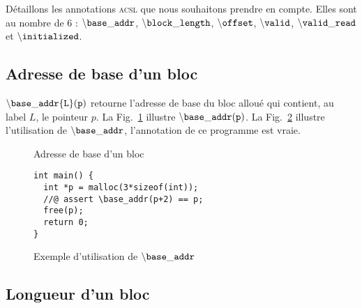 Détaillons les annotations \textsc{acsl} que nous souhaitons prendre en compte.
Elles sont au nombre de 6 : ${\tt \backslash base\_addr}$,
${\tt \backslash block\_length}$, ${\tt \backslash offset}$,
${\tt \backslash valid}$, ${\tt \backslash valid\_read}$ et
${\tt \backslash initialized}$.

\subsection{Adresse de base d'un bloc}

${\tt \backslash base\_addr\{L\}(p)}$ retourne l'adresse de base du bloc alloué
qui contient, au label $L$, le pointeur $p$. La Fig.~\ref{fig:base-addr}
illustre ${\tt \backslash base\_addr(p)}$. La Fig.~\ref{fig:base-addr-example}
illustre l'utilisation de ${\tt \backslash base\_addr}$, l'annotation de ce
programme est vraie.

\begin{figure}[h]
  \begin{center}
  \end{center}
  \caption{Adresse de base d'un bloc}
  \label{fig:base-addr}
\end{figure}


\begin{figure}[h]
\begin{lstlisting}
int main() {
  int *p = malloc(3*sizeof(int));
  //@ assert \base_addr(p+2) == p;
  free(p);
  return 0;
}
\end{lstlisting}
\caption{Exemple d'utilisation de ${\tt \backslash base\_addr}$}
\label{fig:base-addr-example}
\end{figure}



\subsection{Longueur d'un bloc}

